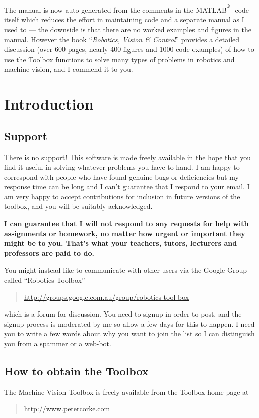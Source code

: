 \documentclass[a4paper]{report}
\def\Mlab{MATLAB$^{\textsuperscript{\textregistered}}$}
\begin{document}
The manual is now auto-generated from the comments in the \Mlab\ code itself which reduces the effort
in maintaining code and a separate manual as I used to --- the downside is that there are no worked examples and figures in the manual.
However the book ``\textit{Robotics, Vision \& Control}''  provides a detailed discussion (over 600 pages, nearly 400 figures and 1000 code examples)
of how to use the Toolbox functions to
solve many types of problems in robotics and machine vision, and I commend it to you.


\newpage
\tableofcontents
\newpage
\chapter{Introduction}

\section{Support}
There is no support!  This software is made freely available in the hope that you find it useful in solving whatever problems
you have to hand.
I am happy to correspond with people who have found genuine
bugs or deficiencies but my response time can be long and I can't guarantee that I respond to your email.
I am very happy to accept contributions for inclusion in future versions of the
toolbox, and you will be suitably acknowledged.

\textbf{I can guarantee that I will not respond to any requests for help with assignments or homework, no matter
how urgent or important they might be to you.  That's what your teachers, tutors, lecturers and professors are paid to do.}

You might instead like to communicate with other users via 
the Google Group called ``Robotics Toolbox'' 
\begin{quote}
\url{http://groups.google.com.au/group/robotics-tool-box}
\end{quote}
which is a forum for discussion.
You need to signup in order to post, and the signup process is moderated by me so allow a few
days for this to happen.  I need you to write a few words about why you want to join the list
so I can distinguish you from a spammer or a web-bot.

\section{How to obtain the Toolbox}
The Machine Vision Toolbox is freely available from the Toolbox home
page at 
\begin{quote}
\url{http://www.petercorke.com}
\end{quote}
\end{document}

